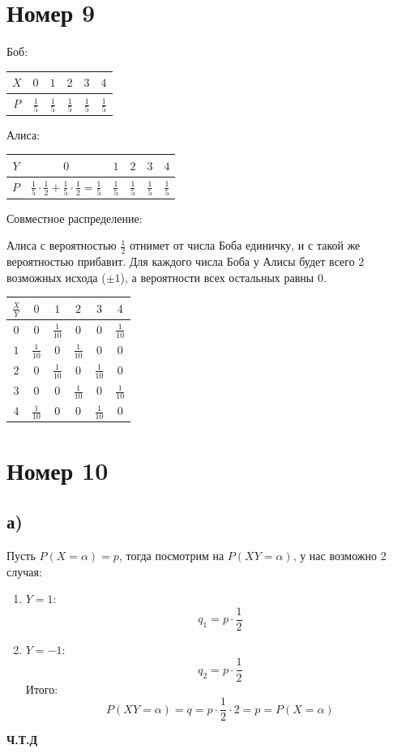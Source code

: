 \documentclass[a4paper,12pt]{article}
\begin{document}
\section*{Номер 9}
Боб:
\begin{center}
\begin{tabular}{|c|c|c|c|c|c|}
\hline
 $X$&$0$  &$1$  &  $2$&  $3$&$4$  \\
\hline
 $P$&  $\frac15$&   $\frac15$&  $\frac15$ &  $\frac15$ & $\frac15$  \\
\hline
\end{tabular}
\end{center}
Алиса:
\begin{center}
\begin{tabular}{|c|c|c|c|c|c|}
\hline
 $Y$&$0$  &$1$  &  $2$&  $3$&$4$  \\
\hline
 $P$&  $\frac15 \cdot \frac 12 + \frac15 \cdot \frac12 = \frac15$&   $\frac15$&  $\frac15$ &  $\frac15$ & $\frac15$  \\
\hline
\end{tabular}
\end{center}
Совместное распределение:

Алиса с вероятностью $\frac12$ отнимет от числа Боба единичку, и с такой же вероятностью прибавит. Для каждого числа Боба у Алисы будет всего 2 возможных исхода ($\pm 1$), а вероятности всех остальных равны 0.
\begin{center}
\begin{tabular}{|c|c|c|c|c|c|}
\hline
 $\frac{X}{Y}$& $0$ &  $1$& $2$ &  $3$& $4$ \\
\hline
 $0$& 0&  $\frac{1}{10}$&  0&  0& $\frac{1}{10}$ \\
\hline
$1$ &$\frac{1}{10}$ &  0&  $\frac{1}{10}$&  0& 0 \\
\hline
$2$ &  0&  $\frac{1}{10}$& 0 &  $\frac{1}{10}$&  0\\
\hline
$3$ & 0 &  0&  $\frac{1}{10}$&  0&  $\frac{1}{10}$\\
\hline
 $4$&  $\frac{1}{10}$&  0& 0 & $\frac{1}{10}$ & 0\\
\hline
\end{tabular}
\end{center}
\clearpage
\section*{Номер 10}
\subsection*{а)}
Пусть $P(X = \alpha) = p$, тогда посмотрим на $P(XY = \alpha)$, у нас возможно 2 случая:
\begin{enumerate}
\item $Y = 1$:
\[
q_1 = p \cdot \frac{1}{2}
\]
\item $Y = -1$:
\[
q_2 = p \cdot \frac{1}{2}
\]
Итого:
\[
P(XY = \alpha) = q = p \cdot \frac12 \cdot 2 = p = P(X = \alpha)
\]
\end{enumerate}
\begin{center}
\textbf{Ч.Т.Д} 
\end{center}
\end{document}
